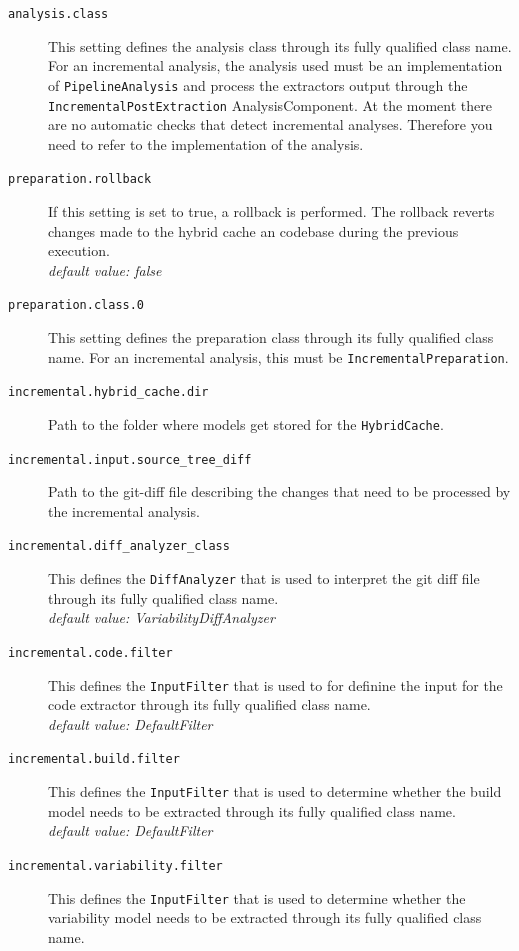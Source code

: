 \documentclass[a4paper]{article}
\begin{document}
\begin{description}
	\item[\texttt{analysis.class}] This setting defines the analysis class through its fully qualified class name. For an incremental analysis, the analysis used must be an implementation of \texttt{PipelineAnalysis} and process the extractors output through the \texttt{IncrementalPostExtraction} AnalysisComponent. At the moment there are no automatic checks that detect incremental analyses. Therefore you need to refer to the implementation of the analysis. 
	\item[\texttt{preparation.rollback}] If this setting is set to true, a rollback is performed. The rollback reverts changes made to the hybrid cache an codebase during the previous execution. \\
		\emph{default value: false}
	\item[\texttt{preparation.class.0}] This setting defines the preparation class through its fully qualified class name. For an incremental analysis, this must be \texttt{IncrementalPreparation}. 
	\item[\texttt{incremental.hybrid\_cache.dir}] Path to the folder where models get stored for the \texttt{HybridCache}.
	\item[\texttt{incremental.input.source\_tree\_diff}] Path to the git-diff file describing the changes that need to be processed by the incremental analysis.
	\item[\texttt{incremental.diff\_analyzer\_class}] This defines the \texttt{DiffAnalyzer} that is used to interpret the git diff file through its fully qualified class name. \\
	    \emph{default value: VariabilityDiffAnalyzer}
	\item[\texttt{incremental.code.filter}] This defines the \texttt{InputFilter} that is used to for definine the input for the code extractor through its fully qualified class name. \\
	    \emph{default value: DefaultFilter}
	\item[\texttt{incremental.build.filter}] This defines the \texttt{InputFilter} that is used to determine whether the build model needs to be extracted through its fully qualified class name. \\
	    \emph{default value: DefaultFilter} 
	\item[\texttt{incremental.variability.filter}] This defines the \texttt{InputFilter} that is used to determine whether the variability model needs to be extracted through its fully qualified class name. \\

\end{description}
\end{document}
